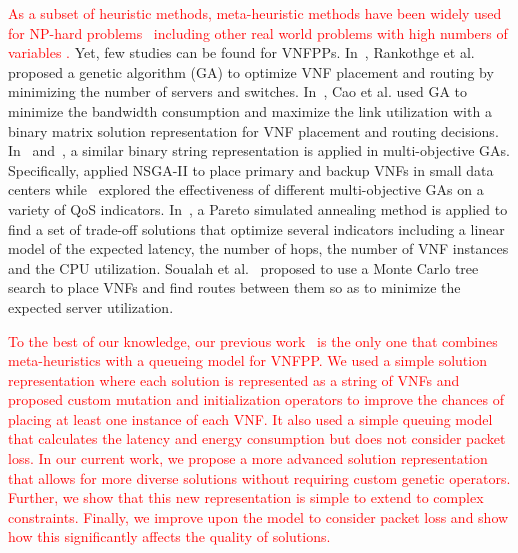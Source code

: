 \textcolor{red}{As a subset of heuristic methods, meta-heuristic methods have been widely used for NP-hard problems~\cite{XueZB13,MavrovouniotisM17,YuanBTZLL17,ChenZLGGZYCLZ19,YoonK13} including other real world problems with high numbers of variables \cite{JiaMZ21,PengJW19,ChengJ15}.} Yet, few studies can be found for VNFPPs. In~\cite{RankothgeMLRL15}, Rankothge et al. proposed a genetic algorithm (GA) to optimize VNF placement and routing by minimizing the number of servers and switches. In~\cite{CaoZACHS16}, Cao et al. used GA to minimize the bandwidth consumption and maximize the link utilization with a binary matrix solution representation for VNF placement and routing decisions. In~\cite{ChantreF20} and~\cite{KaurGK020}, a similar binary string representation is applied in multi-objective GAs. Specifically, \cite{ChantreF20} applied NSGA-II \cite{DebAPM02} to place primary and backup VNFs in small data centers while~\cite{KaurGK020} explored the effectiveness of different multi-objective GAs on a variety of QoS indicators. In~\cite{LangeGZTJ17}, a Pareto simulated annealing method is applied to find a set of trade-off solutions that optimize several indicators including a linear model of the expected latency, the number of hops, the number of VNF instances and the CPU utilization. Soualah et al.~\cite{SoualahMGZ17} proposed to use a Monte Carlo tree search to place VNFs and find routes between them so as to minimize the expected server utilization.

\textcolor{red}{
To the best of our knowledge, our previous work~\cite{BillingsleyLMMG19} is the only one that combines meta-heuristics with a queueing model for VNFPP. We used a simple solution representation where each solution is represented as a string of VNFs and proposed custom mutation and initialization operators to improve the chances of placing at least one instance of each VNF. It also used a simple queuing model that calculates the latency and energy consumption but does not consider packet loss. In our current work, we propose a more advanced solution representation that allows for more diverse solutions without requiring custom genetic operators. Further, we show that this new representation is simple to extend to complex constraints. Finally, we improve upon the model to consider packet loss and show how this significantly affects the quality of solutions.}